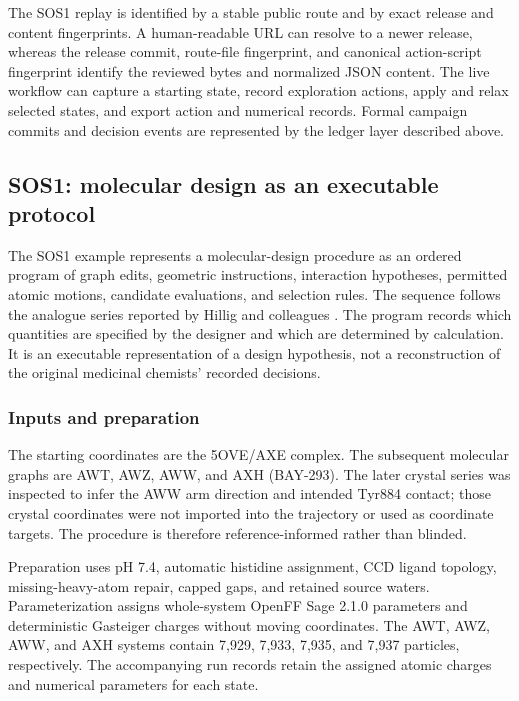 \documentclass[11pt]{article}
\begin{document}
\begin{small}
The SOS1 replay is identified by a stable public route and by exact release and content fingerprints. A human-readable URL can resolve to a newer release, whereas the release commit, route-file fingerprint, and canonical action-script fingerprint identify the reviewed bytes and normalized JSON content. The live workflow can capture a starting state, record exploration actions, apply and relax selected states, and export action and numerical records. Formal campaign commits and decision events are represented by the ledger layer described above.

\subsection{SOS1: molecular design as an executable protocol}

The SOS1 example represents a molecular-design procedure as an ordered program of graph edits, geometric instructions, interaction hypotheses, permitted atomic motions, candidate evaluations, and selection rules. The sequence follows the analogue series reported by Hillig and colleagues \citep{hillig2019sos1}. The program records which quantities are specified by the designer and which are determined by calculation. It is an executable representation of a design hypothesis, not a reconstruction of the original medicinal chemists' recorded decisions.

\subsubsection{Inputs and preparation}

The starting coordinates are the 5OVE/AXE complex. The subsequent molecular graphs are AWT, AWZ, AWW, and AXH (BAY-293). The later crystal series was inspected to infer the AWW arm direction and intended Tyr884 contact; those crystal coordinates were not imported into the trajectory or used as coordinate targets. The procedure is therefore reference-informed rather than blinded.

Preparation uses pH 7.4, automatic histidine assignment, CCD ligand topology, missing-heavy-atom repair, capped gaps, and retained source waters. Parameterization assigns whole-system OpenFF Sage 2.1.0 parameters and deterministic Gasteiger charges without moving coordinates. The AWT, AWZ, AWW, and AXH systems contain 7,929, 7,933, 7,935, and 7,937 particles, respectively. The accompanying run records retain the assigned atomic charges and numerical parameters for each state.


\end{small}
\end{document}
